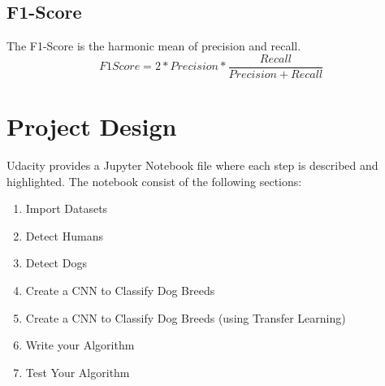 \documentclass{article}
\begin{document}
\subsection{F1-Score}
The F1-Score is the harmonic mean of precision and recall.
\begin{equation}
F1 Score = 2 * Precision * \frac{Recall}{Precision + Recall}
\end{equation}


\section{Project Design} \label{s_poject}
Udacity provides a Jupyter Notebook file where each step is described and highlighted. The notebook consist of the following sections:
\begin{enumerate}
	\item Import Datasets
	\item Detect Humans
	\item Detect Dogs
	\item Create a CNN to Classify Dog Breeds
	\item Create a CNN to Classify Dog Breeds (using Transfer Learning)
	\item Write your Algorithm
	\item Test Your Algorithm
\end{enumerate}




\end{document}
